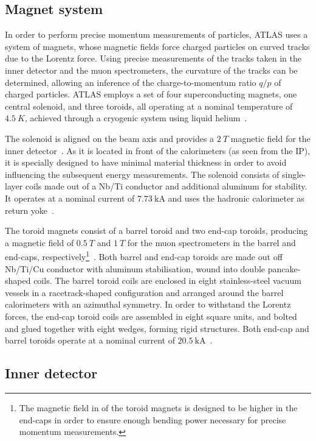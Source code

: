 \subsection{Magnet system}

In order to perform precise momentum measurements of particles, ATLAS uses a system of magnets, whose magnetic fields force charged particles on curved tracks due to the Lorentz force. Using precise measurements of the tracks taken in the inner detector and the muon spectrometers, the curvature of the tracks can be determined, allowing an inference of the charge-to-momentum ratio $q/p$ of charged particles. ATLAS employs a set of four superconducting magnets, one central solenoid, and three toroids, all operating at a nominal temperature of $\SI{4.5}{K}$, achieved through a cryogenic system using liquid helium~\cite{Aad:2008zzm}. 

The solenoid is aligned on the beam axis and provides a $\SI{2}{T}$ magnetic field for the inner detector~\cite{Aad:2008zzm}. As it is located in front of the calorimeters (as seen from the IP), it is specially designed to have minimal material thickness in order to avoid influencing the subsequent energy measurements. The solenoid consists of single-layer coils made out of a Nb/Ti conductor and additional aluminum for stability. It operates at a nominal current of $\SI{7.73}{\kilo\ampere}$ and uses the hadronic calorimeter as return yoke~\cite{Aad:2008zzm}.

The toroid magnets consist of a barrel toroid and two end-cap toroids, producing a magnetic field of $\SI{0.5}{T}$ and $\SI{1}{T}$ for the muon spectrometers in the barrel and end-caps, respectively\footnote{The magnetic field in of the toroid magnets is designed to be higher in the end-caps in order to ensure enough bending power necessary for precise momentum measurements.}~\cite{Aad:2008zzm}. Both barrel and end-cap toroids are made out off Nb/Ti/Cu conductor with aluminum stabilisation, wound into double pancake-shaped coils. The barrel toroid coils are enclosed in eight stainless-steel vacuum vessels in a racetrack-shaped configuration and arranged around the barrel calorimeters with an azimuthal symmetry. In order to withstand the Lorentz forces, the end-cap toroid coils are assembled in eight square units, and bolted and glued together with eight wedges, forming rigid structures. Both end-cap and barrel toroids operate at a nominal current of $\SI{20.5}{\kilo\ampere}$~\cite{Aad:2008zzm}.

\subsection{Inner detector}

